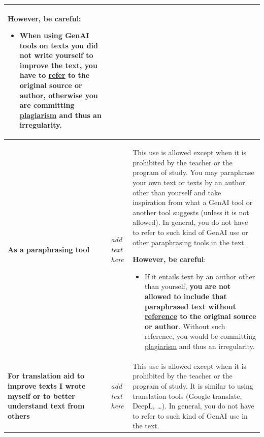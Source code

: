 \begin{longtable}{|p{}|p{}|p{}|}
\textbf{However, be careful: }
\begin{itemize}
    \item When using GenAI tools on texts you did not write yourself to improve the text, \textbf{you have to \href{https://bib.kuleuven.be/english/training-and-tutorials/citation}{refer} to the original source or author}, otherwise you are committing \href{https://www.kuleuven.be/english/education/plagiarism/index}{plagiarism} and thus an irregularity.
\end{itemize} \\ \hline
\textbf{As a paraphrasing tool} & \textit{add text here} & This use is allowed except when it is prohibited by the teacher or the program of study. You may paraphrase your own text or texts by an author other than yourself and take inspiration from what a GenAI tool or another tool suggests (unless it is not allowed). In general, you do not have to refer to such kind of GenAI use or other paraphrasing tools in the text. 

\textbf{However, be careful}: 
\begin{itemize}
    \item If it entails text by an author other than yourself, \textbf{you are not allowed to include that paraphrased text without \href{https://bib.kuleuven.be/english/training-and-tutorials/citation}{reference} to the original source or author}. Without such reference, you would be committing \href{https://www.kuleuven.be/english/education/plagiarism/index}{plagiarism} and thus an irregularity.
\end{itemize} \\ \hline
\textbf{For translation aid to improve texts I wrote myself or to better understand text from others} & \textit{add text here} & This use is allowed except when it is prohibited by the teacher or the program of study. It is similar to using translation tools (Google translate, DeepL, …). In general, you do not have to refer to such kind of GenAI use in the text. 


\end{longtable}
